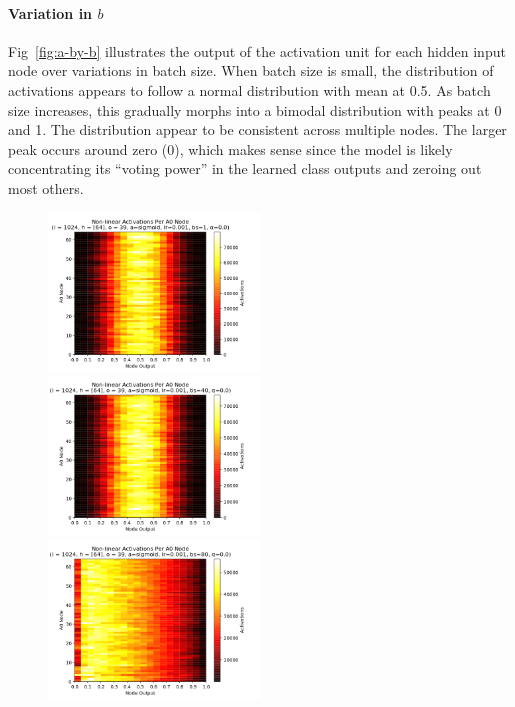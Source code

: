 \documentclass[10pt,epsf]{article}
\begin{document}
{{    \paragraph{Variation in $b$}{
      Fig~\ref{fig:a-by-b} illustrates the output of the activation unit for each hidden input node
      over variations in batch size. When batch size is small, the distribution of activations
      appears to follow a normal distribution with mean at 0.5. As batch size increases, this
      gradually morphs into a bimodal distribution with peaks at 0 and 1. The distribution
      appear to be consistent across multiple nodes. The larger peak occurs around zero (0),
      which makes sense since the model is likely concentrating its ``voting power'' in the
      learned class outputs and zeroing out most others.
    }
    \begin{figure}[H]
      \includegraphics[width=0.5\textwidth]{./img/64-0.001-1-0-sigmoid-1/activations-A0-255.png}
      \includegraphics[width=0.5\textwidth]{./img/64-0.001-40-0-sigmoid-1/activations-A0-255.png}
      \includegraphics[width=0.5\textwidth]{./img/64-0.001-80-0-sigmoid-1/activations-A0-255.png}

\end{figure}}}
\end{document}
